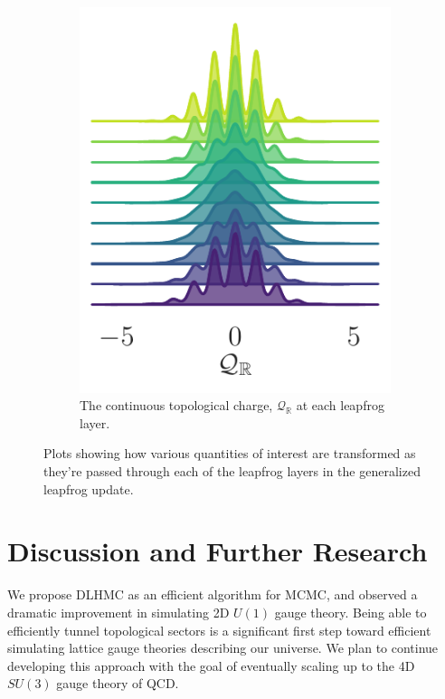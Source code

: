 \documentclass{article} %
\begin{document}
\begin{figure}[hbpt]
\begin{subfigure}[t]{0.315\textwidth}
      \includegraphics[width=\textwidth]{figures/ridgeplots/sinQf.pdf}
      \caption{\label{fig:sinQf}The continuous topological charge, \(\mathcal{Q}_{\mathbb{R}}\) at each
      leapfrog layer.}%
   \end{subfigure}
   \caption{Plots showing how various quantities of interest are transformed as they're passed through each of the
   leapfrog layers in the generalized leapfrog update.}
\end{figure}
%
\section{Discussion and Further Research}
We propose DLHMC as an efficient algorithm for MCMC, and observed a dramatic improvement in simulating 2D $U(1)$ gauge
theory.
%
Being able to efficiently tunnel topological sectors is a significant first step toward efficient simulating lattice
gauge theories describing our universe.
%
We plan to continue developing this approach with the goal of eventually scaling up to the 4D \(SU(3)\) gauge theory of
QCD.\@
%
\end{document}
